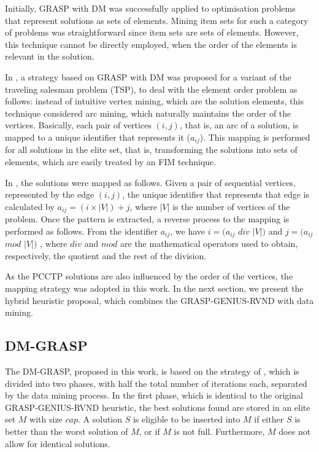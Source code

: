 \documentclass{singlecol-new}
\begin{document}
Initially, GRASP with DM was successfully applied to optimisation problems that represent solutions as sets of elements. Mining item sets for such a category of problems was straightforward since item sets are sets of elements. However, this technique cannot be directly employed, when the order of the elements is relevant in the solution.

In \citet{guerine14}, a strategy based on GRASP with DM was proposed for a variant of the traveling salesman problem (TSP), to deal with the element order problem as follows: instead of intuitive vertex mining, which are the solution elements, this technique considered arc mining, which naturally maintains the order of the vertices. Basically, each pair of vertices $ (i, j) $, that is, an arc of a solution, is mapped to a unique identifier that represents it ($a_{ij}$). This mapping is performed for all solutions in the elite set, that is, transforming the solutions into sets of elements, which are easily treated by an FIM technique.


In \citet{guerine14}, the solutions were mapped as follows. Given a pair of sequential vertices, represented by the edge $ (i, j) $, the unique identifier that represents that edge is calculated by $ a_{ij} = (i \times | V |) + j $, where $ | V | $ is the number of vertices of the problem. Once the pattern is extracted, a reverse process to the mapping is performed as follows. From the identifier $ a_{ij} $, we have $ i = (a_{ij} $ $ div $ $ | V |) $ and $ j = (a_{ij} $ $ mod $ $ | V |) $ , where $ div $ and $ mod $ are the mathematical operators used to obtain, respectively, the quotient and the rest of the division.

As the PCCTP solutions are also influenced by the order of the vertices, the \citet {guerine14} mapping strategy was adopted in this work. In the next section, we present the hybrid heuristic proposal, which combines the GRASP-GENIUS-RVND with data mining.

\subsection{DM-GRASP}

The DM-GRASP, proposed in this work, is based on the strategy of \citet{guerine14}, which is divided into two phases, with half the total number of iterations each, separated by the data mining process. In the first phase, which is identical to the original GRASP-GENIUS-RVND heuristic, the best solutions found are stored in an elite set $M$ with size $cap$. A solution $S$ is eligible to be inserted into $M$ if either $S$ is better than the worst solution of $M$, or if $M$ is not full. Furthermore, $M$ does not allow for identical solutions.
\end{document}
